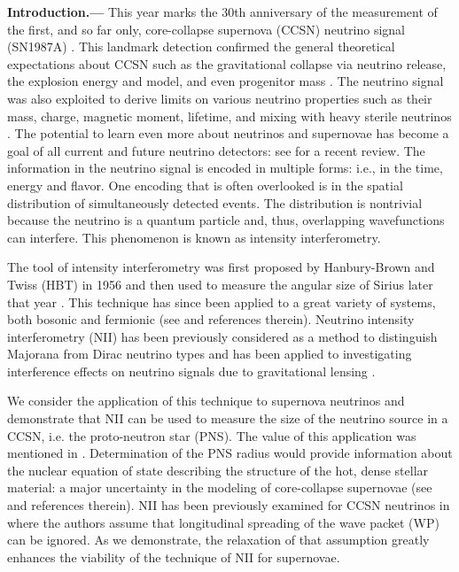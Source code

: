 \documentclass[aps,prl,reprint,floatfix
]{revtex4-1}
\newcommand{\heading}[1]{\textbf{#1.---}}
\begin{document}
\heading{Introduction}
This year marks the 30th anniversary of the measurement of the first, and so far only, core-collapse supernova (CCSN) neutrino signal (SN1987A) \cite{1987PhRvL..58.1490H,1987PhRvL..58.1494B,1988PhLB..205..209A,1987EL......3.1315A}. This landmark detection confirmed the general theoretical expectations about CCSN such as the gravitational collapse via neutrino release, the explosion energy and model, and even progenitor mass \cite{2002PhRvD..65f3002L,1987Natur.329..689K,1987PhRvL..58.2722S,2004PhRvD..70d3006C,1987Natur.326..135B,2007fnpa.book.....G}. The neutrino signal was also exploited to derive limits on various neutrino properties such as their mass, charge, magnetic moment, lifetime, and mixing with heavy sterile neutrinos \cite{2007fnpa.book.....G,1987Natur.329...21B,1988PhRvL..60Q1789G,1988PhRvL..61...27B,1989PhRvL..62..505C,1989PhRvL..62..509K,2000NuPhB.590..562D}. The potential to learn even more about neutrinos and supernovae has become a goal of all current and future neutrino detectors: see \cite{2012ARNPS..62...81S} for a recent review. The information in the neutrino signal is encoded in multiple forms: i.e., in the time, energy and flavor. One encoding that is often overlooked is in the spatial distribution of simultaneously detected events. The distribution is nontrivial because the neutrino is a quantum particle and, thus, overlapping wavefunctions can interfere. This phenomenon is known as intensity interferometry.

The tool of intensity interferometry was first proposed by Hanbury-Brown and Twiss (HBT) in 1956 \cite{1956Natur.177...27B} and then used to measure the angular size of Sirius later that year \cite{1956Natur.178.1046H}. This technique has since been applied to a great variety of systems, both bosonic and fermionic (see \cite{1998AcPPB..29.1839B} and references therein). Neutrino intensity interferometry (NII) has been previously considered as a method to distinguish Majorana from Dirac neutrino types \cite{2006PhRvL..96l1802G} and has been applied to investigating interference effects on neutrino signals due to gravitational lensing \cite{2004PhRvD..69f3008C}.

We consider the application of this technique to supernova neutrinos and demonstrate that NII can be used to measure the size of the neutrino source in a CCSN, i.e. the proto-neutron star (PNS). The value of this application was mentioned in \cite{2001NuPhS..91..351P}. Determination of the PNS radius would provide information about the nuclear equation of state describing the structure of the hot, dense stellar material: a major uncertainty in the modeling of core-collapse supernovae (see \cite{2013ApJ...771...51L} and references therein). NII has been previously examined for CCSN neutrinos in \cite{2016arXiv160500344L} where the authors assume that longitudinal spreading of the wave packet (WP) can be ignored. As we demonstrate, the relaxation of that assumption greatly enhances the viability of the technique of NII for supernovae.
\end{document}
